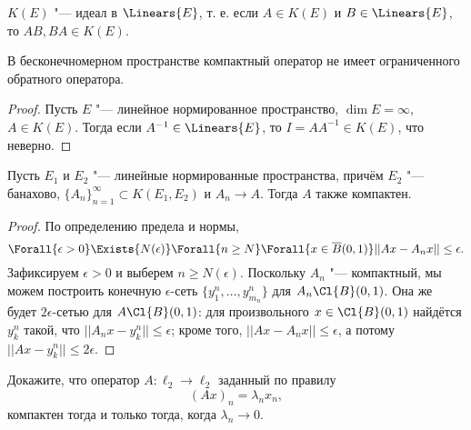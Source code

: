 \documentclass[main]{subfiles}
\begin{document}
\begin{exercise}
  \( K(E) \) "--- идеал в \( \Linears{E} \),
  т. е. если \( A \in K(E) \) и \( B \in \Linears{E} \),
  то \( AB, BA \in K(E) \).
\end{exercise}

\begin{corollary}
  В бесконечномерном пространстве компактный оператор
  не имеет ограниченного обратного оператора.
\end{corollary}
\begin{proof}
  Пусть \( E \) "--- линейное нормированное пространство, \( \dim E = \infty \), \( A \in K(E) \).
  Тогда если \( A^{-1} \in \Linears{E} \), то
  \( I = A A^{-1} \in K(E) \), что неверно.
\end{proof}

\begin{theorem}
  Пусть \( E_1 \) и \( E_2 \) "---
  линейные нормированные пространства,
  причём \( E_2 \) "--- банахово,
  \( \{ A_n \}_{n=1}^\infty \subset K(E_1, E_2) \)
  и \( A_n \to A \).
  Тогда \( A \) также компактен.
\end{theorem}
\begin{proof}
  По определению предела и нормы,
  \[
    \Forall{\epsilon > 0} \Exists{N(\epsilon)}
    \Forall{n \ge N}
    \Forall{x \in \overline{B}(0, 1)}
    ||A x - A_n x|| \le \epsilon.
  \]
  Зафиксируем \( \epsilon > 0 \)
  и выберем \( n \ge N(\epsilon) \).
  Поскольку \( A_n \) "--- компактный,
  мы можем построить конечную \( \epsilon \)-сеть
  \( \{ y^n_1, \dots, y^n_{m_n} \} \)
  для \( A_n \Cl{B}(0, 1) \).
  Она же будет \( 2\epsilon \)-сетью для
  \( A \Cl{B}(0, 1) \):
  для произвольного \( x \in \Cl{B}(0, 1) \)
  найдётся \( y^n_k \) такой,
  что \( ||A_n x - y^n_k|| \le \epsilon \);
  кроме того, \( ||A x - A_n x|| \le \epsilon \),
  а потому \( ||A x - y^n_k|| \le 2\epsilon \).
\end{proof}

\begin{exercise}
  Докажите, что оператор
  \( A : \ell_2 \to \ell_2 \) заданный
  по правилу
  \[
    (A x)_n = \lambda_n x_n,
  \]
  компактен тогда и только тогда,
  когда \( \lambda_n \to 0 \).
\end{exercise}
\end{document}
